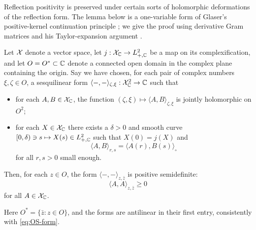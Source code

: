 Reflection positivity is preserved under certain sorts of holomorphic
deformations of the reflection form. The lemma below is a
one-variable form of Glaser's positive-kernel continuation principle
\cite[Theorem~A]{Glaser}; we give the proof using derivative Gram
matrices and his Taylor-expansion argument
\cite[\S3, p.~14]{Glaser1969}.
\begin{lemma}\label{lem:analytic-positivity}
Let $\mathcal{X}$ denote a vector space, let $j:\mathcal{X}_{\mathbb{C}}\to L^2_{+,\mathbb{C}}$
be a map on its complexification, and let $O=O^*\subset\mathbb{C}$ denote a connected
open domain in the complex plane containing the origin. Say we have
chosen, for each pair of complex numbers $\xi,\zeta\in O$, a
sesquilinear form $\langle-,-\rangle_{\zeta,\xi}:\mathcal{X}_{\mathbb{C}}^2\to\mathbb{C}$
such that
\begin{itemize}
\item for each $A,B\in\mathcal{X}_{\mathbb{C}}$, the function
$(\zeta,\xi)\mapsto\langle A,B\rangle_{\zeta,\xi}$ is jointly
holomorphic on $O^2$;
\item for each $X\in\mathcal{X}_{\mathbb{C}}$ there exists a $\delta>0$ and smooth
curve $[0,\delta)\ni s\mapsto X(s)\in L^2_{+,\mathbb{C}}$ such that $X(0)=j(X)$
and
\begin{equation}
 \langle A,B\rangle_{r,s}=\langle A(r),B(s)\rangle_\circ
\end{equation}
for all $r,s>0$ small enough.
\end{itemize}
Then, for each $z\in O$, the form
$\langle-,-\rangle_{z,\bar z}$ is positive semidefinite:
\begin{equation}
 \langle A,A\rangle_{z,\bar z}\geq0
\end{equation}
for all $A\in\mathcal{X}_{\mathbb{C}}$.
\end{lemma}
Here $O^*=\{\bar z:z\in O\}$, and the forms are antilinear in their
first entry, consistently with \eqref{eq:OS-form}.

